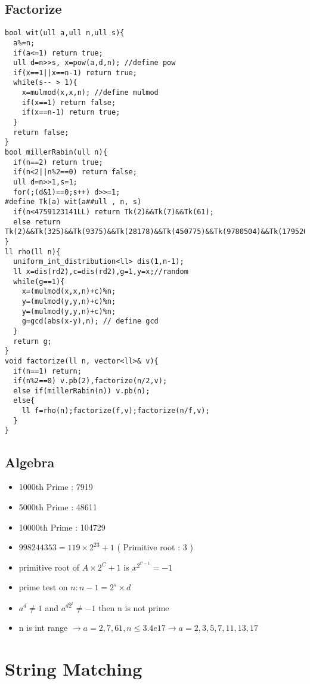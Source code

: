 \documentclass[landscape, 8pt, a4paper, oneside, twocolumn]{extarticle}
\begin{document}
\subsection{Factorize}
\begin{verbatim}
bool wit(ull a,ull n,ull s){
  a%=n;
  if(a<=1) return true;
  ull d=n>>s, x=pow(a,d,n); //define pow
  if(x==1||x==n-1) return true;
  while(s-- > 1){
    x=mulmod(x,x,n); //define mulmod
    if(x==1) return false;
    if(x==n-1) return true;
  }
  return false;
}
bool millerRabin(ull n){
  if(n==2) return true;
  if(n<2||n%2==0) return false;
  ull d=n>>1,s=1;
  for(;(d&1)==0;s++) d>>=1;
#define Tk(a) wit(a##ull , n, s)
  if(n<4759123141LL) return Tk(2)&&Tk(7)&&Tk(61);
  else return Tk(2)&&Tk(325)&&Tk(9375)&&Tk(28178)&&Tk(450775)&&Tk(9780504)&&Tk(1795265022);
}
ll rho(ll n){
  uniform_int_distribution<ll> dis(1,n-1);
  ll x=dis(rd2),c=dis(rd2),g=1,y=x;//random
  while(g==1){
    x=(mulmod(x,x,n)+c)%n;
    y=(mulmod(y,y,n)+c)%n;
    y=(mulmod(y,y,n)+c)%n;
    g=gcd(abs(x-y),n); // define gcd
  }
  return g;
}
void factorize(ll n, vector<ll>& v){
  if(n==1) return;
  if(n%2==0) v.pb(2),factorize(n/2,v);
  else if(millerRabin(n)) v.pb(n);
  else{
    ll f=rho(n);factorize(f,v);factorize(n/f,v);
  }
}
\end{verbatim}

\subsection{Algebra}
\begin{itemize}
    \item 1000th Prime : 7919 
    \item 5000th Prime : 48611
    \item 10000th Prime : 104729
    \item $ 998244353 = 119 \times 2 ^ {23} + 1 $ ( Primitive root : 3 ) 
    \item primitive root of $ A  \times 2 ^ {C} +1 $ is $ x ^ { 2 ^ {C - 1} } = -1 $
    \item prime test on $ n : n - 1 = 2 ^ {s} \times d $
    \item $ a ^ {d} \ne 1 $ and $ a ^ { d2 ^ {t} } \ne -1 $ then n is not prime
    \item n is int range $ \to a=2,7,61 , n \leq 3.4e17 \to a=2,3,5,7,11,13,17 $
\end{itemize}

\section{String Matching}
\end{document}
